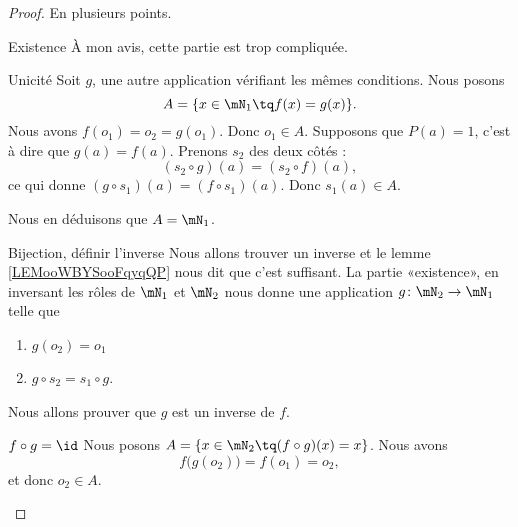 \begin{proof}
    En plusieurs points.
    \begin{subproof}
    \item[Existence]
        À mon avis, cette partie est trop compliquée.
    \item[Unicité]
        Soit \( g\), une autre application vérifiant les mêmes conditions. Nous posons
        \begin{equation}
            A=\{ x\in \mN_1\tq f(x)=g(x) \}.
        \end{equation}
        Nous avons \( f(o_1)=o_2=g(o_1)\). Donc \( o_1\in A\). Supposons que \( P(a)=1\), c'est à dire que \( g(a)=f(a)\). Prenons \( s_2\) des deux côtés :
        \begin{equation}
            (s_2\circ g)(a)=(s_2\circ f)(a),
        \end{equation}
        ce qui donne \( (g\circ s_1)(a)=(f\circ s_1)(a)\). Donc \( s_1(a)\in A\).

        Nous en déduisons que \( A=\mN_1\).
    \item[Bijection, définir l'inverse]
        Nous allons trouver un inverse et le lemme \ref{LEMooWBYSooFqyqQP} nous dit que c'est suffisant. La partie «existence», en inversant les rôles de \( \mN_1\) et \( \mN_2\) nous donne une application \( g\colon \mN_2\to \mN_1\) telle que
        \begin{enumerate}
            \item
                \( g(o_2)=o_1\)
            \item
                \( g\circ s_2=s_1\circ g\).
        \end{enumerate}
        Nous allons prouver que \( g\) est un inverse de \( f\).
    \item[\( f\circ g=\id\)]
        Nous posons \( A=\{ x\in \mN_2\tq (f\circ g)(x)=x \}\). Nous avons
        \begin{equation}
            f\big( g(o_2) \big)=f(o_1)=o_2,
        \end{equation}
        et donc \( o_2\in A\).


\end{subproof}
\end{proof}
